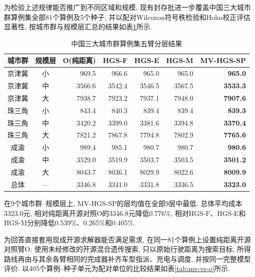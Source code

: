 \documentclass{setp-new}
\newcommand{\setptabsetup}{\fontsize{9pt}{10.5pt}\selectfont\renewcommand{\arraystretch}{0.95}\setlength{\tabcolsep}{2.2pt}\setlength{\aboverulesep}{0.4pt}\setlength{\belowrulesep}{0.4pt}\hbadness=10000}
\begin{document}
为检验上述规律能否推广到不同区域和规模,
现有封存批进一步覆盖中国三大城市群算例集全部81个算例及5个种子,
并以配对Wilcoxon符号秩检验和Holm校正评估显著性,
按城市群与规模层汇总的结果如表\ref{tab:china81-summary}所示.

\begin{table}[H]
\centering
\caption{中国三大城市群算例集五臂分层结果}
\label{tab:china81-summary}
\setptabsetup
\begin{tabular*}{\linewidth}{@{\extracolsep{\fill}}ccrrrrr@{}}
\toprule
城市群 & 规模层 & O(纯距离) & HGS-F & HGS-E & HGS-M & MV-HGS-SP\\
\midrule
京津冀 & 小 & 969.5 & 966.6 & 965.0 & 965.0 & \textbf{965.0} \\
京津冀 & 中 & 3566.6 & 3542.4 & 3546.5 & 3567.5 & \textbf{3533.3} \\
京津冀 & 大 & 7938.7 & 7923.2 & 7937.1 & 7948.0 & \textbf{7907.6} \\
珠三角 & 小 & 843.4 & 840.3 & 839.4 & 839.4 & \textbf{839.3} \\
珠三角 & 中 & 3420.2 & 3399.0 & 3381.6 & 3394.8 & \textbf{3370.4} \\
珠三角 & 大 & 7821.2 & 7867.8 & 7794.8 & 7802.9 & \textbf{7765.6} \\
成渝 & 小 & 989.4 & 985.1 & 980.7 & 980.7 & \textbf{980.6} \\
成渝 & 中 & 3529.0 & 3519.9 & 3503.7 & 3503.5 & \textbf{3501.2} \\
成渝 & 大 & 8043.7 & 8036.1 & 8029.9 & 8022.6 & \textbf{8009.9} \\
\midrule
总体 & --- & 3346.8 & 3341.0 & 3331.8 & 3336.5 & \textbf{3323.0} \\
\bottomrule
\end{tabular*}
\end{table}

在9个城市群--规模层上, MV-HGS-SP的层均值在全部9层中最低.
总体平均成本3323.0元, 相对纯距离开源对照O的3346.8元降低0.776\%,
相对HGS-F、HGS-E和HGS-M分别降低0.539\%、0.265\%和0.405\%.

为回答直接套用现成开源求解器能否满足需求, 在同一81个算例上设置纯距离开源对照臂O:
使用未经修改的开源混合遗传搜索\cite{ref:64}, 只以原始行驶距离为搜索目标,
所得路线再由与其余各臂相同的完成器补齐车型指派、充电与调度, 并按同一完整模型评价.
以405个算例--种子单元为配对单位的比较结果如表\ref{tab:mv-vs-o}所示.
\end{document}
